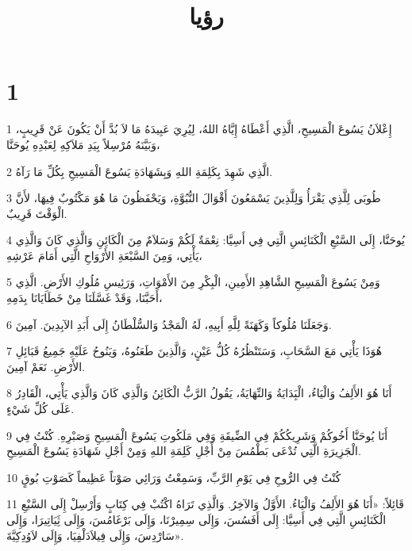 

\title{رؤيا}


\chapter{1}

\par 1 إِعْلاَنُ يَسُوعَ الْمَسِيحِ، الَّذِي أَعْطَاهُ إِيَّاهُ اللهُ، لِيُرِيَ عَبِيدَهُ مَا لاَ بُدَّ أَنْ يَكُونَ عَنْ قَرِيبٍ، وَبَيَّنَهُ مُرْسِلاً بِيَدِ مَلاَكِهِ لِعَبْدِهِ يُوحَنَّا،
\par 2 الَّذِي شَهِدَ بِكَلِمَةِ اللهِ وَبِشَهَادَةِ يَسُوعَ الْمَسِيحِ بِكُلِّ مَا رَآهُ.
\par 3 طُوبَى لِلَّذِي يَقْرَأُ وَلِلَّذِينَ يَسْمَعُونَ أَقْوَالَ النُّبُوَّةِ، وَيَحْفَظُونَ مَا هُوَ مَكْتُوبٌ فِيهَا، لأَنَّ الْوَقْتَ قَرِيبٌ.
\par 4 يُوحَنَّا، إِلَى السَّبْعِ الْكَنَائِسِ الَّتِي فِي أَسِيَّا: نِعْمَةٌ لَكُمْ وَسَلاَمٌ مِنَ الْكَائِنِ وَالَّذِي كَانَ وَالَّذِي يَأْتِي، وَمِنَ السَّبْعَةِ الأَرْوَاحِ الَّتِي أَمَامَ عَرْشِهِ،
\par 5 وَمِنْ يَسُوعَ الْمَسِيحِ الشَّاهِدِ الأَمِينِ، الْبِكْرِ مِنَ الأَمْوَاتِ، وَرَئِيسِ مُلُوكِ الأَرْضِ. الَّذِي أَحَبَّنَا، وَقَدْ غَسَّلَنَا مِنْ خَطَايَانَا بِدَمِهِ،
\par 6 وَجَعَلَنَا مُلُوكاً وَكَهَنَةً لِلَّهِ أَبِيهِ، لَهُ الْمَجْدُ وَالسُّلْطَانُ إِلَى أَبَدِ الآبِدِينَ. آمِينَ.
\par 7 هُوَذَا يَأْتِي مَعَ السَّحَابِ، وَسَتَنْظُرُهُ كُلُّ عَيْنٍ، وَالَّذِينَ طَعَنُوهُ، وَيَنُوحُ عَلَيْهِ جَمِيعُ قَبَائِلِ الأَرْضِ. نَعَمْ آمِينَ.
\par 8 أَنَا هُوَ الأَلِفُ وَالْيَاءُ، الْبَِدَايَةُ وَالنِّهَايَةُ، يَقُولُ الرَّبُّ الْكَائِنُ وَالَّذِي كَانَ وَالَّذِي يَأْتِي، الْقَادِرُ عَلَى كُلِّ شَيْءٍ.
\par 9 أَنَا يُوحَنَّا أَخُوكُمْ وَشَرِيكُكُمْ فِي الضِّيقَةِ وَفِي مَلَكُوتِ يَسُوعَ الْمَسِيحِ وَصَبْرِهِ. كُنْتُ فِي الْجَزِيرَةِ الَّتِي تُدْعَى بَطْمُسَ مِنْ أَجْلِ كَلِمَةِ اللهِ وَمِنْ أَجْلِ شَهَادَةِ يَسُوعَ الْمَسِيحِ.
\par 10 كُنْتُ فِي الرُّوحِ فِي يَوْمِ الرَّبِّ، وَسَمِعْتُ وَرَائِي صَوْتاً عَظِيماً كَصَوْتِ بُوقٍ
\par 11 قَائِلاً: «أَنَا هُوَ الأَلِفُ وَالْيَاءُ. الأَوَّلُ وَالآخِرُ. وَالَّذِي تَرَاهُ اكْتُبْ فِي كِتَابٍ وَأَرْسِلْ إِلَى السَّبْعِ الْكَنَائِسِ الَّتِي فِي أَسِيَّا: إِلَى أَفَسُسَ، وَإِلَى سِمِيرْنَا، وَإِلَى بَرْغَامُسَ، وَإِلَى ثَِيَاتِيرَا، وَإِلَى سَارْدِسَ، وَإِلَى فِيلاَدَلْفِيَا، وَإِلَى لاَوُدِكِيَّةَ».
